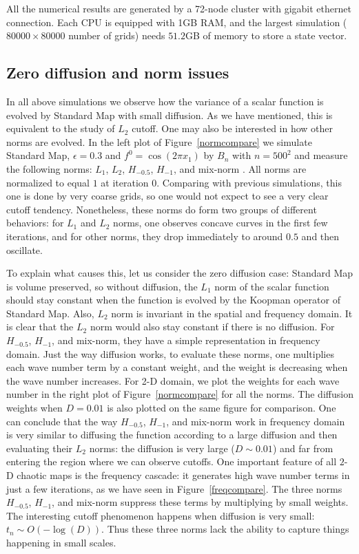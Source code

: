 All the numerical results are generated by a 72-node cluster with gigabit ethernet connection. Each CPU is equipped with 1GB RAM, and the largest simulation ($80000\times80000$ number of grids) needs $51.2$GB of memory to store a state vector.



\subsection{Zero diffusion and norm issues}
In all above simulations we observe how the variance of a scalar function is evolved by Standard Map with small diffusion. As we have mentioned, this is equivalent to the study of $L_2$ cutoff. One may also be interested in how other norms are evolved. In the left plot of Figure~\ref{normcompare} we simulate Standard Map, $\epsilon=0.3$ and $f^0= \cos(2\pi x_1)$ by $B_n$ with $n=500^2$ and measure the following norms: $L_1$, $L_2$, $H_{-0.5}$, $H_{-1}$, and mix-norm \cite{Mezic2005}. All norms are normalized to equal $1$ at iteration $0$. Comparing with previous simulations, this one is done by very coarse grids, so one would not expect to see a very clear cutoff tendency. Nonetheless, these norms do form two groups of different behaviors: for $L_1$ and $L_2$ norms, one observes concave curves in the first few iterations, and for other norms, they drop immediately to around $0.5$ and then oscillate. 


To explain what causes this, let us consider the zero diffusion case: Standard Map is volume preserved, so without diffusion, the $L_1$ norm of the scalar function should stay constant when the function is evolved by the Koopman operator of Standard Map. Also, $L_2$ norm is invariant in the spatial and frequency domain. It is clear that the $L_2$ norm would also stay constant if there is no diffusion. For $H_{-0.5}$, $H_{-1}$, and mix-norm, they have a simple representation in frequency domain. Just the way diffusion works, to evaluate these norms, one multiplies each wave number term by a constant weight, and the weight is decreasing when the wave number increases. For 2-D domain, we plot the weights for each wave number in the right plot of Figure~\ref{normcompare} for all the norms. The diffusion weights when $D=0.01$ is also plotted on the same figure for comparison. One can conclude that the way $H_{-0.5}$, $H_{-1}$, and mix-norm work in frequency domain is very similar to diffusing the function according to a large diffusion and then evaluating their $L_2$ norms: the diffusion is very large ($D \sim 0.01$) and far from entering the region where we can observe cutoffs.  
One important feature of all $2$-D chaotic maps is the frequency cascade: it generates high wave number terms in just a few iterations, as we have seen in Figure~\ref{freqcompare}. The three norms $H_{-0.5}$, $H_{-1}$, and mix-norm suppress these terms by multiplying by small weights. The interesting cutoff phenomenon happens when diffusion is very small: $t_n\sim O(-\log(D))$. Thus these three norms lack the ability to capture things happening in small scales.

